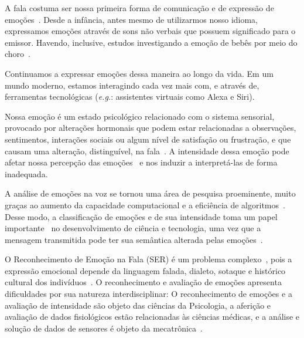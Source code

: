 

A fala costuma ser nossa primeira forma de comunicação e de expressão de emoções~\cite{1.5}. Desde a infância, antes mesmo de utilizarmos nosso idioma, expressamos emoções através de sons não verbais que possuem significado para o emissor. Havendo, inclusive, estudos investigando a emoção de bebês por meio do choro~\cite{0}.

Continuamos a expressar emoções dessa maneira ao longo da vida. Em um mundo moderno, estamos interagindo cada vez mais com, e através de, ferramentas tecnológicas (\textit{e.g.}: assistentes virtuais como Alexa e Siri).

Nossa emoção é um estado psicológico relacionado com o sistema sensorial, provocado por alterações hormonais que podem estar relacionadas a observações, sentimentos, interações sociais ou algum nível de satisfação ou frustração, e que causam uma alteração, distinguível, na fala~\cite{8}. A intensidade dessa emoção pode afetar nossa percepção das emoções~\cite{18.46} e nos induzir a interpretá-las de forma inadequada.

A análise de emoções na voz se tornou uma área de pesquisa proeminente, muito graças ao aumento da capacidade computacional e a eficiência de algoritmos~\cite{38, 20}. Desse modo, a classificação de emoções e de sua intensidade toma um papel importante~\cite{3} no desenvolvimento de ciência e tecnologia, uma vez que a mensagem transmitida pode ter sua semântica alterada pelas emoções~\cite{39}.

O Reconhecimento de Emoção na Fala (\acrshort{SER}) é um problema complexo~\cite{complexidade1}, pois a expressão emocional depende da linguagem falada, dialeto, sotaque e histórico cultural dos indivíduos~\cite{6}. O reconhecimento e avaliação de emoções apresenta dificuldades por sua natureza interdisciplinar: O reconhecimento de emoções e a avaliação de intensidade são objeto das ciências da Psicologia, a aferição e avaliação de dados fisiológicos estão relacionadas às ciências médicas, e a análise e solução de dados de sensores é objeto da mecatrônica~\cite{17}.

